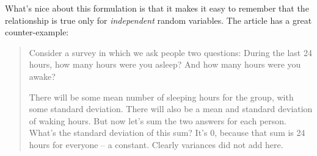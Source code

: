 \documentclass[11pt, oneside]{article}
\begin{document}
What's nice about this formulation is that it makes it easy to remember that the relationship is true only for \emph{independent} random variables.  The article has a great counter-example:

\begin{quote}\color{blue}Consider a survey in which we ask people two questions: During the last 24 hours, how many hours were you asleep? And how many hours were you awake?

There will be some mean number of sleeping hours for the group, with some standard deviation. There will also be a mean and standard deviation of waking hours. But now let's sum the two answers for each person. What's the standard deviation of this sum? It's 0, because that sum is 24 hours for everyone -- a constant. Clearly variances did not add here.\color{black}\end{quote}
\end{document}
